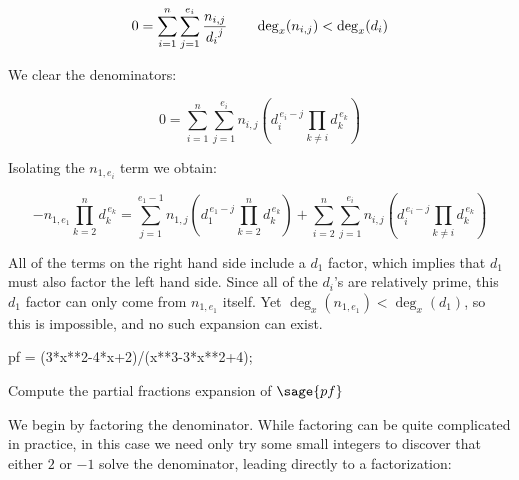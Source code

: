 \begin{equation}
0=\sum_{i=1}^{n}\sum_{j=1}^{e_i} {n_{i,j}\over {d_i}^j}
\qquad \deg_x (n_{i,j}) < \deg_x (d_i)
\end{equation}

We clear the denominators:

\begin{equation}
0 =\sum_{i=1}^{n}\sum_{j=1}^{e_i} n_{i,j} \left( d_i^{\,e_i-j} \prod_{k \ne i} d_k^{\,e_k} \right)
\end{equation}

Isolating the $n_{1,e_i}$ term we obtain:

\begin{equation}
-n_{1,e_1}\prod_{k = 2}^{n} d_{k}^{\,e_k}=\sum_{j=1}^{e_1-1} n_{1,j} \left( d_1^{\,e_1-j} \prod_{k =2}^n d_k^{\,e_k} \right)
+ \sum_{i=2}^{n}\sum_{j=1}^{e_i} n_{i,j} \left( d_i^{\,e_i-j} \prod_{k \ne i} d_k^{\,e_k} \right)
\end{equation}


All of the terms on the right hand side include a $d_1$ factor, which implies that
$d_1$ must also factor the left hand side.
Since all of the $d_i$'s are relatively
prime, this $d_1$ factor can only come from
$n_{1,e_1}$ itself.  Yet
$\deg_x (n_{1,e_1}) < \deg_x (d_1)$, so this is impossible,
and no such expansion can exist.

\endtheorem



\vfill\eject

\example

\begin{sagecommon}
pf = (3*x**2-4*x+2)/(x**3-3*x**2+4);
\end{sagecommon}

Compute the partial fractions expansion of $\sage{pf}$

We begin by factoring the denominator.  While factoring can be quite
complicated in practice, in this case we need only try some small
integers to discover that either $2$ or $-1$ solve the denominator,
leading directly to a factorization:

